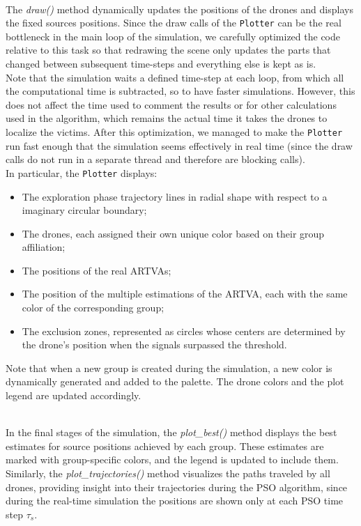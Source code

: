 \noindent\\
The \textit{draw()} method dynamically updates the positions of the 
drones and displays the fixed sources positions.
Since the draw calls of the \texttt{Plotter} can be the real bottleneck in the 
main loop of the simulation, we carefully optimized the code relative 
to this task so that redrawing the scene only updates the parts that 
changed between subsequent time-steps and everything else is kept as is.\\
Note that the simulation waits a defined time-step at each loop, 
from which all the computational time is subtracted, so to have faster simulations. 
However, this does not affect the time used to comment the results or for other 
calculations used in the algorithm, which remains the actual time it takes the 
drones to localize the victims. After this optimization, 
we managed to make the \texttt{Plotter} run fast 
enough that the simulation seems effectively in real time (since 
the draw calls do not run in a separate thread and therefore are blocking calls).\\

\noindent
In particular, the \texttt{Plotter} displays:
\begin{itemize}
    \item The exploration phase trajectory lines in radial shape with respect to 
    a imaginary circular boundary; 
    \item The drones, each assigned their own unique color based on their group affiliation;
    \item The positions of the real ARTVAs; 
    \item The position of the multiple estimations of the ARTVA, each with 
    the same color of the corresponding group;
    \item The exclusion zones, represented as circles whose centers are determined
    by the drone's position when the signals surpassed the threshold. 
\end{itemize}
Note that when a new group is created during 
the simulation, a new color is dynamically generated and added 
to the palette. The drone colors and the plot legend are updated 
accordingly.

\noindent\\
In the final stages of the simulation, the \textit{plot\_best()} 
method displays the best estimates for source positions achieved 
by each group. These estimates are marked with group-specific colors, 
and the legend is updated to include them. Similarly, 
the \textit{plot\_trajectories()} method visualizes the paths 
traveled by all drones, providing insight into their trajectories
during the PSO algorithm, since during the real-time simulation
the positions are shown only at each PSO time step $\tau_s$.

